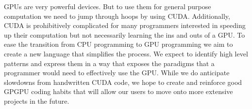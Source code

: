 \documentclass{article}
\begin{document}
GPUs are very powerful devices. But to use them for general purpose computation we need to jump through hoops by using CUDA. Additionally, CUDA is prohibitively complicated for many programmers interested in speeding up their computation but not necessarily learning the ins and outs of a GPU. To ease the transition from CPU programming to GPU programming we aim to create a new language that simplifies the process. We expect to identify high level patterns and express them in a way that exposes the paradigms that a programmer would need to effectively use the GPU. While we do anticipate slowdowns from handwritten CUDA code, we hope to create and reinforce good GPGPU coding habits that will allow our users to move onto more extensive projects in the future.




\end{document}
